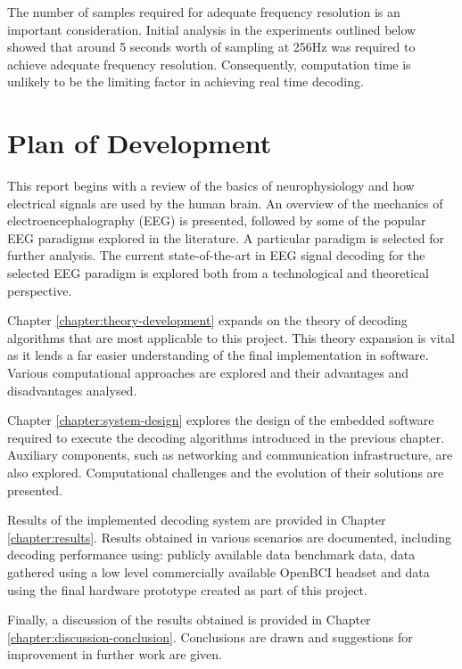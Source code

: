 The number of samples required for adequate frequency resolution is an important consideration. Initial analysis in the experiments outlined below showed that around 5 seconds worth of sampling at 256Hz was required to achieve adequate frequency resolution. Consequently, computation time is unlikely to be the limiting factor in achieving real time decoding.

\section{Plan of Development}
This report begins with a review of the basics of neurophysiology and how electrical signals are used by the human brain. An overview of the mechanics of electroencephalography (EEG) is presented, followed by some of the popular EEG paradigms explored in the literature. A particular paradigm is selected for further analysis. The current state-of-the-art in EEG signal decoding for the selected EEG paradigm is explored both from a technological and theoretical perspective. 

Chapter \ref{chapter:theory-development} expands on the theory of decoding algorithms that are most applicable to this project. This theory expansion is vital as it lends a far easier understanding of the final implementation in software. Various computational approaches are explored and their advantages and disadvantages analysed. 

Chapter \ref{chapter:system-design} explores the design of the embedded software required to execute the decoding algorithms introduced in the previous chapter. Auxiliary components, such as networking and communication infrastructure, are also explored. Computational challenges and the evolution of their solutions are presented. 

Results of the implemented decoding system are provided in Chapter \ref{chapter:results}. Results obtained in various scenarios are documented, including decoding performance using: publicly available data benchmark data, data gathered using a low level commercially available OpenBCI headset and data using the final hardware prototype created as part of this project. 

Finally, a discussion of the results obtained is provided in Chapter \ref{chapter:discussion-conclusion}. Conclusions are drawn and suggestions for improvement in further work are given. 